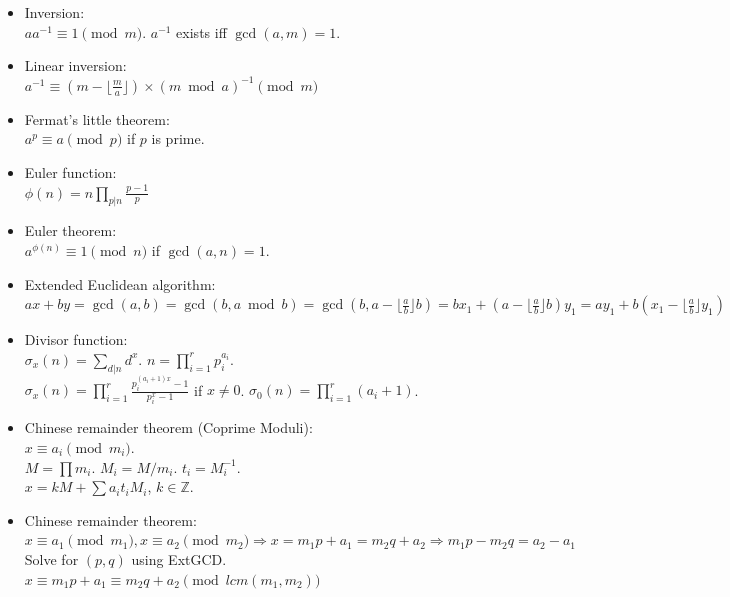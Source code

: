 \documentclass[a4paper,10pt,twocolumn,oneside,x11names]{article}
\begin{document}
{\normalsize \begin{itemize}
    \item Inversion:\\ $aa^{-1} \equiv 1 \pmod{m}$. $a^{-1}$ exists iff $\gcd(a,m)=1$.
    
    \item Linear inversion:\\ $a^{-1} \equiv (m - \lfloor\frac{m}{a}\rfloor) \times (m \bmod a)^{-1} \pmod{m}$
    
    \item Fermat's little theorem:\\ $a^p \equiv a \pmod{p}$ if $p$ is prime.
    
    \item Euler function:\\ $\phi(n)=n \prod_{p|n} \frac{p-1}{p}$
    
    \item Euler theorem:\\ $a^{\phi(n)} \equiv 1 \pmod{n}$ if $\gcd(a,n) = 1$.
    
    \item Extended Euclidean algorithm:\\
    $ax+by=\gcd(a,b)=\gcd(b, a \bmod b)=\gcd(b, a-\lfloor\frac{a}{b}\rfloor b)=bx_1+(a-\lfloor\frac{a}{b}\rfloor b)y_1=ay_1+b(x_1-\lfloor\frac{a}{b}\rfloor y_1)$
    
    \item Divisor function:\\ $\sigma_x(n) = \sum_{d|n}d^x$. $n=\prod_{i=1}^r p_i^{a_i}$.\\ $\sigma_x(n)=\prod_{i=1}^r \frac{p_i^{(a_i+1)x}-1}{p_i^x-1}$ if $x \neq 0$. $\sigma_0(n)=\prod_{i=1}^r (a_i+1)$.
    
    \item Chinese remainder theorem (Coprime Moduli):\\ $x \equiv a_i \pmod{m_i}$.\\
        $M=\prod m_i$. $M_i=M/m_i$. $t_i=M_i^{-1}$.\\
        $x = kM + \sum a_i t_i M_i$, $k \in \mathbb{Z}$.
        
    \item Chinese remainder theorem:\\
    $x \equiv a_1 \pmod{m_1}, x \equiv a_2 \pmod{m_2} \Rightarrow x = m_1 p + a_1 = m_2 q + a_2 \Rightarrow m_1 p - m_2 q = a_2 - a_1$\\
    Solve for $(p, q)$ using ExtGCD.\\
    $x \equiv m_1 p + a_1 \equiv m_2 q + a_2 \pmod{lcm(m_1, m_2)}$
    

\end{itemize}}
\end{document}
